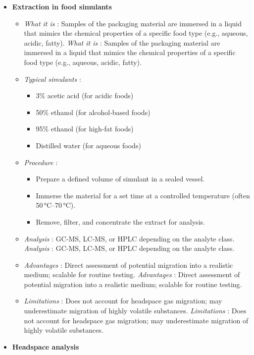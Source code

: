 \begin{itemize}
\item 
\textbf{Extraction in food simulants}
  \begin{itemize}
\item \textit{What it is} : Samples of the packaging material are immersed in a liquid that mimics the chemical properties of a specific food type (e.g., aqueous, acidic, fatty).
\textit{What it is} : Samples of the packaging material are immersed in a liquid that mimics the chemical properties of a specific food type (e.g., aqueous, acidic, fatty).
\item 
\textit{Typical simulants} :
    \begin{itemize}
\item 3\% acetic acid (for acidic foods)
\item 50\% ethanol (for alcohol‑based foods)
\item 95\% ethanol (for high‑fat foods)
\item Distilled water (for aqueous foods)
    \end{itemize}
\item 
\textit{Procedure} :
    \begin{itemize}
\item Prepare a defined volume of simulant in a sealed vessel.
\item Immerse the material for a set time at a controlled temperature (often 50 °C–70 °C).
\item Remove, filter, and concentrate the extract for analysis.
    \end{itemize}
\item \textit{Analysis} : GC‑MS, LC‑MS, or HPLC depending on the analyte class.
\textit{Analysis} : GC‑MS, LC‑MS, or HPLC depending on the analyte class.
\item \textit{Advantages} : Direct assessment of potential migration into a realistic medium; scalable for routine testing.
\textit{Advantages} : Direct assessment of potential migration into a realistic medium; scalable for routine testing.
\item \textit{Limitations} : Does not account for headspace gas migration; may underestimate migration of highly volatile substances.
\textit{Limitations} : Does not account for headspace gas migration; may underestimate migration of highly volatile substances.
  \end{itemize}
\item 
\textbf{Headspace analysis}
  \begin{itemize}

\end{itemize}
\end{itemize}
